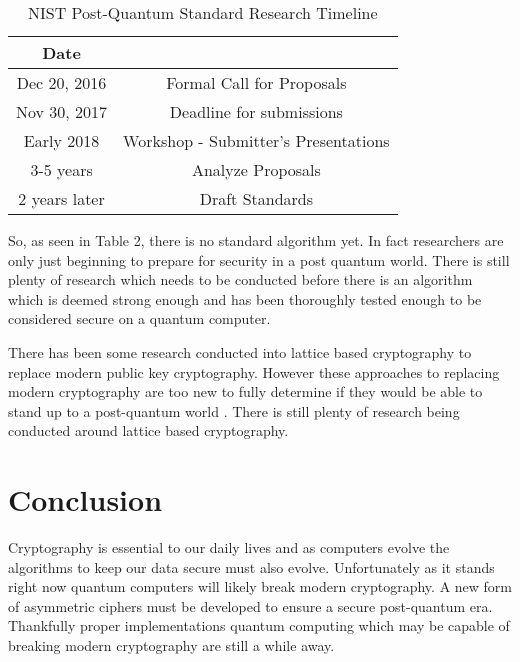\documentclass[fleqn, 12pt]{article}
\begin{document}
\begin{table}[!h]
    \caption{NIST Post-Quantum Standard Research Timeline \cite{nist}}
    \label{table:keys}
    \begin{center}
        \begin{tabular}{|c|c|}
            \hline
                \textbf{Date} & \\\hline
                Dec 20, 2016 &  Formal Call for Proposals\\\hline
                Nov 30, 2017 & Deadline for submissions\\\hline
                Early 2018 & Workshop - Submitter's Presentations\\\hline
                3-5 years & Analyze Proposals\\\hline
                2 years later & Draft Standards\\
            \hline
        \end{tabular}
    \end{center}
\end{table}

So, as seen in Table 2, there is no standard algorithm yet. In fact researchers are only just beginning to prepare for security in a post quantum world. There is still plenty of research which needs to be conducted before there is an algorithm which is deemed strong enough and has been thoroughly tested enough to be considered secure on a quantum computer.

There has been some research conducted into lattice based cryptography to replace modern public key cryptography. However these approaches to replacing modern cryptography are too new to fully determine if they would be able to stand up to a post-quantum world \cite{lattice}. There is still plenty of research being conducted around lattice based cryptography.

\section{Conclusion}

Cryptography is essential to our daily lives and as computers evolve the algorithms to keep our data secure must also evolve. Unfortunately as it stands right now quantum computers will likely break modern cryptography. A new form of asymmetric ciphers must be developed to ensure a secure post-quantum era. Thankfully proper implementations quantum computing which may be capable of breaking modern cryptography are still a while away.
\end{document}
